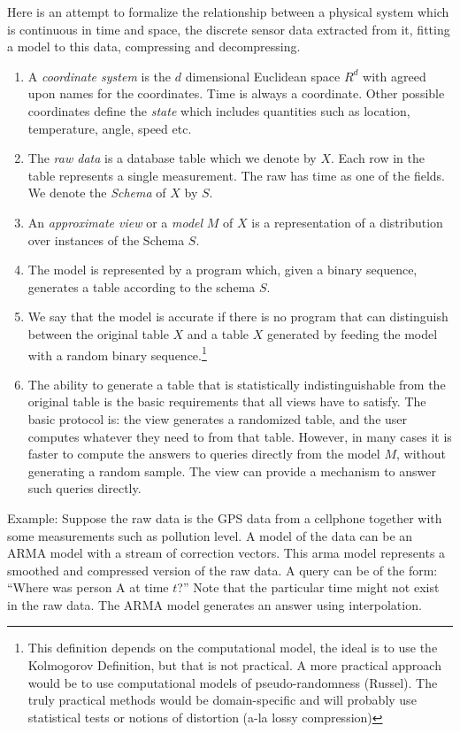 \documentclass[11pt]{article}
\begin{document}
Here is an attempt to formalize the relationship between a physical
system which is continuous in time and space, the discrete sensor data
extracted from it, fitting a model to this data, compressing and
decompressing.
\begin{enumerate}
\item A {\em coordinate system} is the $d$ dimensional Euclidean space
  $R^d$ with agreed upon names for the coordinates. Time is always a
  coordinate. Other possible coordinates define the {\em state} which
  includes quantities such as location, temperature, angle, speed etc. 
\item The {\em raw data} is a database table which we denote by
  $X$. Each row in the table represents a single measurement. The raw
  has time as one of the fields. We denote the {\em Schema} of $X$ by $S$.
\item An {\em approximate view} or a {\em model} $M$ of $X$ is a
  representation of a distribution over instances of the Schema $S$.
\item The model is represented by a program which, given a binary
  sequence, generates a table according to the schema $S$.
\item We say that the model is accurate if there is no program that
  can distinguish between the original table $X$ and a table $X$
  generated by feeding the model with a random binary
  sequence.\footnote{This definition depends on the computational
    model, the ideal is to use the Kolmogorov Definition, but that is
    not practical. A more practical approach would be to use
    computational models of pseudo-randomness (Russel). The truly
    practical methods would be domain-specific and will probably use
    statistical tests or notions of distortion (a-la lossy
    compression)}
\item The ability to generate a table that is statistically
  indistinguishable from the original table is the basic requirements
  that all views have to satisfy. The basic protocol is: the view
  generates a randomized table, and the user computes whatever they
  need to from that table. However, in many cases it is faster to
  compute the answers to queries directly from the model $M$, without
  generating a random sample. The view can provide a mechanism to
  answer such queries directly.
\end{enumerate}

Example: Suppose the raw data is the GPS data from a cellphone
together with some measurements such as pollution level. A model of
the data can be an ARMA model with a stream of correction
vectors. This arma model represents a smoothed and compressed version
of the raw data. A query can be of the form: ``Where was person A at
time $t$?''  Note that the particular time might not exist in the raw
data. The ARMA model generates an answer using interpolation.
\end{document}

